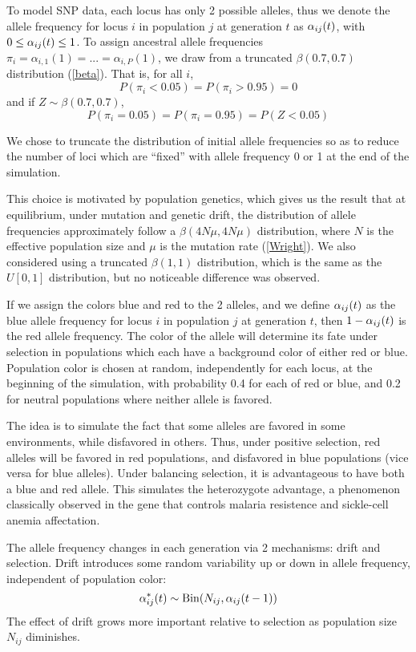 \documentclass[a4paper,12pt]{article}
\begin{document}
To model SNP data, each locus has only 2 possible alleles, thus we
denote the allele frequency for locus $i$ in population $j$ at
generation $t$ as $\alpha_{ij}(t)$, with $0\leq \alpha_{ij}(t)\leq 1$. To assign ancestral
allele frequencies $\pi_i=\alpha_{i,1}(1)=...=\alpha_{i,P}(1)$, we
draw from a truncated $\beta(0.7,0.7)$ distribution
(\autoref{beta}). That is, for all $i$,
$$P(\pi_i<0.05)=P(\pi_i>0.95)=0$$
and if $Z\sim\beta(0.7,0.7)$,
$$P(\pi_i=0.05)=P(\pi_i=0.95)=P(Z<0.05)$$

We chose to truncate the distribution of initial allele frequencies so
as to reduce the number of loci which are ``fixed'' with allele
frequency 0 or 1 at the end of the simulation.

This choice is motivated by population genetics, which gives us the
result that at equilibrium, under mutation and genetic drift, the
distribution of allele frequencies approximately follow a
$\beta(4N\mu,4N\mu)$ distribution, where $N$ is the effective
population size and $\mu$ is the mutation rate (\autoref{Wright}). We
also considered using a truncated $\beta(1,1)$ distribution, which is
the same as the $U[0,1]$ distribution, but no noticeable difference
was observed.


If we assign the colors blue and red to the 2 alleles, and we define
$\alpha_{ij}(t)$ as the blue allele frequency for locus $i$ in population $j$ at
generation $t$, then $1-\alpha_{ij}(t)$ is the red allele frequency. The color
of the allele will determine its fate under selection in populations
which each have a background color of either red or blue. Population
color is chosen at random, independently for each locus, at the
beginning of the simulation, with probability 0.4 for each of red or
blue, and 0.2 for neutral populations where neither allele is favored.

The idea is to simulate the fact that some alleles are favored in some
environments, while disfavored in others. Thus, under positive
selection, red alleles will be favored in red populations, and
disfavored in blue populations (vice versa for blue alleles). Under
balancing selection, it is advantageous to have both a blue and red
allele. This simulates the heterozygote advantage, a phenomenon
classically observed in the gene that controls malaria resistence and
sickle-cell anemia affectation.

The allele frequency changes in each generation via
2 mechanisms: drift and selection. Drift introduces some random
variability up or down in allele frequency, independent of population
color:
$$\alpha_{ij}^*(t) \sim \operatorname{Bin}(N_{ij},\alpha_{ij}(t-1))$$
The effect of drift grows more important relative to selection as
population size $N_{ij}$ diminishes.
\end{document}
